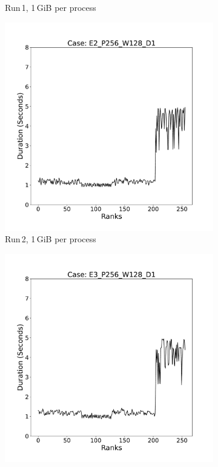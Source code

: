 \begin{figure}
\begin{subfigure}[b]{0.3\textwidth}
         \caption{Run\,1, 1\,GiB per process}
         \label{fig:E1_1}
     \end{subfigure}
     \hfill
     \begin{subfigure}[b]{0.3\textwidth}
         \centering
         \includegraphics[width=\textwidth, height=\textwidth]{figures/E2_P256_W128_D1.pdf}
         \caption{Run\,2, 1\,GiB per process}
         \label{fig:E2_1}
     \end{subfigure}
      \hfill
     \begin{subfigure}[b]{0.3\textwidth}
         \centering
         \includegraphics[width=\textwidth, height=\textwidth]{figures/E3_P256_W128_D1.pdf}

\end{subfigure}
\end{figure}
